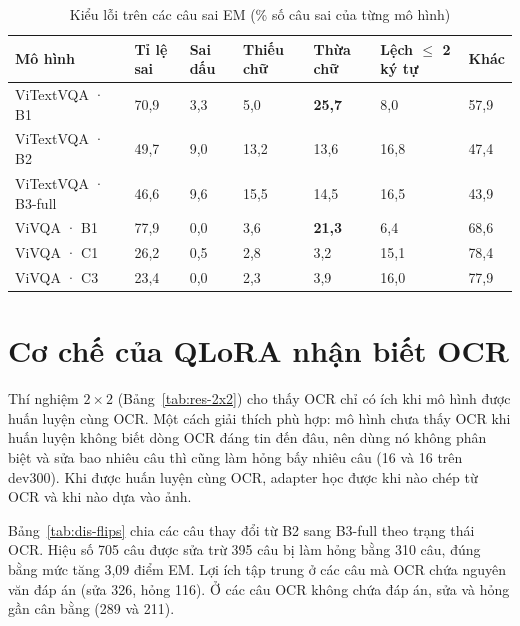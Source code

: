\begin{table}[htbp]
\caption{Kiểu lỗi trên các câu sai EM (\% số câu sai của từng mô hình)}
\label{tab:dis-buckets}
\centering
\small
\begin{tabular}{p{}p{}p{}p{}p{}p{}p{}}
\toprule
\textbf{Mô hình} & \textbf{Tỉ lệ sai} & \textbf{Sai dấu} & \textbf{Thiếu chữ} & \textbf{Thừa chữ} & \textbf{Lệch $\leq$ 2 ký tự} & \textbf{Khác} \\
\midrule
ViTextVQA · B1 & 70,9 & 3,3 & 5,0 & \textbf{25,7} & 8,0 & 57,9 \\
ViTextVQA · B2 & 49,7 & 9,0 & 13,2 & 13,6 & 16,8 & 47,4 \\
ViTextVQA · B3-full & 46,6 & 9,6 & 15,5 & 14,5 & 16,5 & 43,9 \\
\midrule
ViVQA · B1 & 77,9 & 0,0 & 3,6 & \textbf{21,3} & 6,4 & 68,6 \\
ViVQA · C1 & 26,2 & 0,5 & 2,8 & 3,2 & 15,1 & 78,4 \\
ViVQA · C3 & 23,4 & 0,0 & 2,3 & 3,9 & 16,0 & 77,9 \\
\bottomrule
\end{tabular}
\end{table}

\section{Cơ chế của QLoRA nhận biết OCR}
\label{sec:dis-ocr}

Thí nghiệm $2\times2$ (Bảng~\ref{tab:res-2x2}) cho thấy OCR chỉ có ích khi mô hình
được huấn luyện cùng OCR. Một cách giải thích phù hợp: mô hình chưa thấy OCR khi
huấn luyện không biết dòng OCR đáng tin đến đâu, nên dùng nó không phân biệt và
sửa bao nhiêu câu thì cũng làm hỏng bấy nhiêu câu (16 và 16 trên dev300). Khi được
huấn luyện cùng OCR, adapter học được khi nào chép từ OCR và khi nào dựa vào ảnh.

Bảng~\ref{tab:dis-flips} chia các câu thay đổi từ B2 sang B3-full theo trạng thái
OCR. Hiệu số 705 câu được sửa trừ 395 câu bị làm hỏng bằng 310 câu, đúng bằng mức
tăng 3,09 điểm EM. Lợi ích tập trung ở các câu mà OCR chứa nguyên văn đáp án (sửa
326, hỏng 116). Ở các câu OCR không chứa đáp án, sửa và hỏng gần cân bằng (289 và
211).

